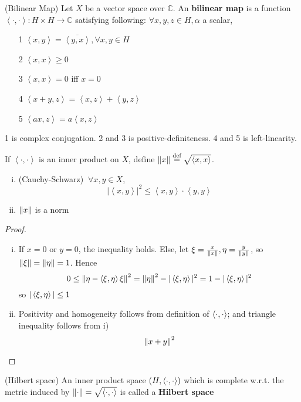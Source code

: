 \documentclass{article}
\begin{document}
\begin{definition}
(Bilinear Map)
	Let $X$ be a vector space over $\mathbb C$. An {\bf bilinear map} is a function $\left<\cdot,\cdot\right>:H \times H \xrightarrow{}{\mathbb C}$ satisfying following: $\forall x,y,z\in H,\alpha$ a scalar,
	\begin{itemize}
		\item[1] $\left<x,y\right>={\overline{\left<y,x\right>}},\forall x,y\in H$
		\item[2] $\left<x,x\right>\geq0$
		\item[3] $\left<x,x\right>=0$ iff $x=0$
		\item[4] $\left<x+y,z\right>=\left<x,z\right>+\left<y,z\right>$
		\item[5] $\left<ax,z\right>=a\left<x,z\right>$
	\end{itemize}
\end{definition}
1 is complex conjugation. 2 and 3 is positive-definiteness. 4 and 5 is left-linearity.


\begin{theorem}
	If $\left<\cdot,\cdot\right>$ is an inner product on $X$, define $\left\|{x}\right\|\overset{\textrm{def}}{=}\sqrt{\left<{x},{x}\right>}$.  
	\begin{enumerate}[i)]
	    \item (Cauchy-Schwarz) $\ \forall x,y\in X$,
	$$|\left<x,y\right>|^2\leq\left<x,y\right>\cdot\left<y,y\right>$$
	\item $\left\|{x}\right\|$ is a norm
\end{enumerate}  
\end{theorem}

\begin{proof}
\begin{enumerate}[i)]
    \item If $x=0$ or $y=0$, the inequality holds. Else, let $\xi = \frac{x}{\left\|{x}\right\|}, \eta = \frac{y}{\left\|{y}\right\|}$, so $\left\|{\xi}\right\|=\left\|{\eta}\right\|=1$. Hence 
    $$0 \leq \left\|{\eta-\left<{\xi},{\eta}\right>\xi}\right\|^2=\left\|{\eta}\right\|^2 - |\left<{\xi},{\eta}\right>|^2=1-|\left<{\xi},{\eta}\right>|^2$$  
    so $|\left<{\xi},{\eta}\right>| \leq 1$
    \item Positivity and homogeneity follows from definition of $\left<{\cdot},{\cdot}\right>$; and triangle inequality follows from i)  
    $$\left\|{x+y}\right\|^2$$
\end{enumerate}
\end{proof}

\begin{definition}
(Hilbert space)
    An inner product space $(H, \left<{\cdot},{\cdot}\right>)$ which is complete w.r.t. the metric induced by $\left\|{\cdot}\right\|=\sqrt{\left<{\cdot},{\cdot}\right>}$ is called a \textbf{Hilbert space}
\end{definition}
\end{document}
